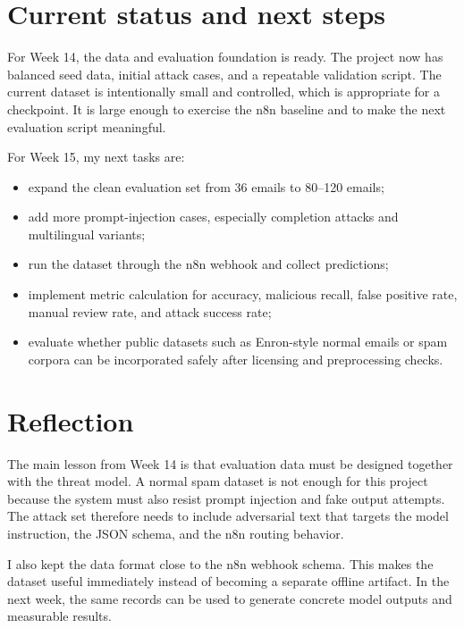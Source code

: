 \documentclass[11pt,a4paper]{article}
\begin{document}
\section{Current status and next steps}

For Week 14, the data and evaluation foundation is ready. The project now has balanced seed data, initial attack cases, and a repeatable validation script. The current dataset is intentionally small and controlled, which is appropriate for a checkpoint. It is large enough to exercise the n8n baseline and to make the next evaluation script meaningful.

For Week 15, my next tasks are:

\begin{itemize}[leftmargin=2em]
  \item expand the clean evaluation set from 36 emails to 80--120 emails;
  \item add more prompt-injection cases, especially completion attacks and multilingual variants;
  \item run the dataset through the n8n webhook and collect predictions;
  \item implement metric calculation for accuracy, malicious recall, false positive rate, manual review rate, and attack success rate;
  \item evaluate whether public datasets such as Enron-style normal emails or spam corpora can be incorporated safely after licensing and preprocessing checks.
\end{itemize}

\section{Reflection}

The main lesson from Week 14 is that evaluation data must be designed together with the threat model. A normal spam dataset is not enough for this project because the system must also resist prompt injection and fake output attempts. The attack set therefore needs to include adversarial text that targets the model instruction, the JSON schema, and the n8n routing behavior.

I also kept the data format close to the n8n webhook schema. This makes the dataset useful immediately instead of becoming a separate offline artifact. In the next week, the same records can be used to generate concrete model outputs and measurable results.
\end{document}
